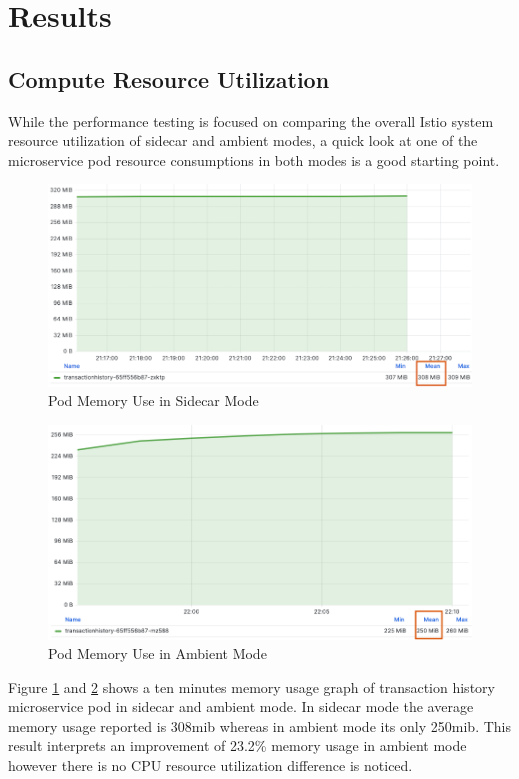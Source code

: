 \section{Results}
\label{resultSection}
\subsection{Compute Resource Utilization}
While the performance testing is focused on comparing the overall Istio system resource utilization of sidecar and ambient modes, a quick look at one of the microservice pod resource consumptions in both modes is a good starting point.

\begin{figure}[ht!]
  \centering
  \includegraphics[width=0.85\linewidth]{resources/sidecar-pod-mem.png}
  \caption{Pod Memory Use in Sidecar Mode}
  \label{result:podMemUseSidecar}
\end{figure}

\begin{figure}[ht!]
  \centering
  \includegraphics[width=0.85\linewidth]{resources/ambient-pod-mem.png}
  \caption{Pod Memory Use in Ambient Mode}
  \label{result:podMemUseAmbient}
\end{figure}

Figure \ref{result:podMemUseSidecar} and \ref{result:podMemUseAmbient} shows a ten minutes memory usage graph of transaction history microservice pod in sidecar and ambient mode. In sidecar mode the average memory usage reported is 308\gls{mib} whereas in ambient mode its only 250\gls{mib}. This result interprets an improvement of 23.2\% memory usage in ambient mode however there is no CPU resource utilization difference is noticed.

